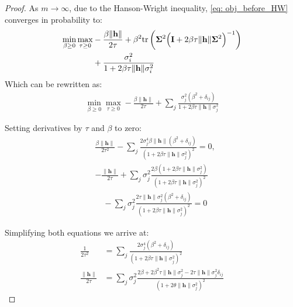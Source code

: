 \documentclass[10pt,a4paper]{amsart}
\begin{document}
\begin{proof}

As $m \to \infty$, due to the Hanson-Wright inequality, \eqref{eq: obj_before_HW} converges in probability to:
\begin{align*}
\min_{\beta \ge 0} \max_{\tau \ge 0} &- \frac{\beta\|\mathbf{h}\|}{2\tau} +\beta^2 \mathrm{tr} \left(\boldsymbol{\Sigma}^2\Bigl(\mathbf{I} + 2 \beta\tau \|\mathbf{h}\|\boldsymbol{\Sigma}^2\Bigr)^{-1}\right) \nonumber\\
&+ \frac{\sigma_i^2}{1 + 2\beta\tau\|\mathbf{h}\|\sigma_i^2} \nonumber
\end{align*}
Which can be rewritten as:
\begin{align}\label{eq: right_after_HW}
\min_{\beta \ge 0} \max_{\tau \ge 0} - \frac{\beta\|\mathbf{h}\|}{2\tau} +  \sum_j \frac{\sigma_j^2(\beta^2 + \delta_{ij})}{1 + 2\beta\tau\|\mathbf{h}\|\sigma_j^2} 
\end{align}


Setting derivatives by $\tau$ and $\beta$ to zero:
\begin{align*}
&\frac{\beta\|\mathbf{h}\|}{2\tau^2} -  \sum_j \frac{2\sigma_j^4\beta\|\mathbf{h}\|(\beta^2 + \delta_{ij})}{(1 + 2\beta\tau\|\mathbf{h}\|\sigma_j^2)^2} = 0, \\
&- \frac{\|\mathbf{h}\|}{2\tau} + \sum_j \sigma_j^2 \frac{2\beta(1 + 2\beta\tau\|\mathbf{h}\|\sigma_j^2)}{(1 + 2\beta\tau\|\mathbf{h}\|\sigma_j^2)^2} \nonumber\\
&\quad - \sum_j \sigma_j^2\frac{2\tau \|\mathbf{h}\|\sigma_j^2(\beta^2 + \delta_{ij})}{(1 + 2\beta\tau\|\mathbf{h}\|\sigma_j^2)^2} = 0 \nonumber
\end{align*}

Simplifying both equations we arrive at:
\begin{align*}
\frac{1}{2\tau^2} &=  \sum_j \frac{2\sigma_j^4(\beta^2 + \delta_{ij})}{(1 + 2\beta\tau\|\mathbf{h}\|\sigma_j^2)^2} \\
\frac{\|\mathbf{h}\|}{2\tau}  &= \sum_j \sigma_j^2 \frac{2\beta + 2\beta^2\tau\|\mathbf{h}\|\sigma_j^2 - 2\tau \|\mathbf{h}\|\sigma_j^2 \delta_{ij}}{(1 + 2\theta\|\mathbf{h}\|\sigma_j^2)^2} \nonumber
\end{align*}


\end{proof}
\end{document}
